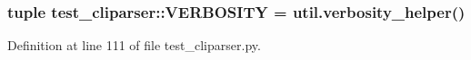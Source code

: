 \hypertarget{namespacetest__cliparser_a05eba1500250a44deba6212dafcece55}{
\subsubsection[{\-V\-E\-R\-B\-O\-S\-I\-T\-Y}]{\setlength{\rightskip}{0pt plus 5cm}tuple {\bf test\-\_\-cliparser\-::\-V\-E\-R\-B\-O\-S\-I\-T\-Y} = util.\-verbosity\-\_\-helper()}}
\label{namespacetest__cliparser_a05eba1500250a44deba6212dafcece55}


\-Definition at line 111 of file test\-\_\-cliparser.\-py.

